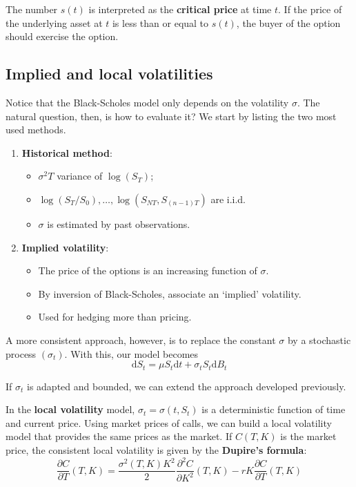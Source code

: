 The number $s(t)$ is interpreted as the \textbf{critical price} at time $t$. If the price of the underlying asset at $t$ is less than or equal to $s(t)$, the buyer of the option should exercise the option. 

\subsection{Implied and local volatilities}

Notice that the Black-Scholes model only depends on the volatility $\sigma$. The natural question, then, is how to evaluate it? We start by listing the two most used methods.

\begin{enumerate}
    \item \textbf{Historical method}:
    \begin{itemize}
        \item $\sigma^2T$ variance of $\log(S_T)$;
        \item $\log(S_T/S_0), \ldots, \log(S_{NT},S_{(n-1)T})$ are i.i.d. 
        \item $\sigma$ is estimated by past observations.
    \end{itemize}
    \item \textbf{Implied volatility}:
    \begin{itemize}
        \item The price of the options is an increasing function of $\sigma$.
        \item By inversion of Black-Scholes, associate an `implied' volatility.
        \item Used for hedging more than pricing. 
    \end{itemize}
\end{enumerate}

A more consistent approach, however, is to replace the constant $\sigma$ by a stochastic process $(\sigma_t)$. With this, our model becomes 
\[
    \mathrm{d}S_t = \mu S_t \mathrm{d}t + \sigma_t S_t \mathrm{d}B_t
\]

If $\sigma_t$ is adapted and bounded, we can extend the approach developed previously. 

In the \textbf{local volatility} model, $\sigma_t = \sigma(t, S_t)$ is a deterministic function of time and current price. Using market prices of calls, we can build a local volatility model that provides the same prices as the market. If $C(T,K)$ is the market price, the consistent local volatility is given by the \textbf{Dupire's formula}:
\[
    \frac{\partial C}{\partial T}(T, K) = \frac{\sigma^2(T, K) K^2}{2} \frac{\partial^2 C}{\partial K^2}(T, K) - rK \frac{\partial C}{\partial T}(T, K)
\]


